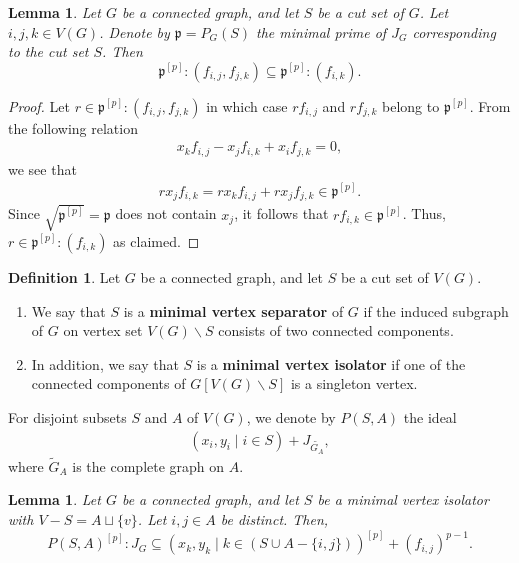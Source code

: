 \documentclass[12pt,a4paper]{amsart}
\theoremstyle{plain}
\newtheorem{lemma}[thrm]{Lemma}
\theoremstyle{definition}
\newtheorem{defn}[thrm]{Definition}
\def\bdefn{\begin{defn}}
\def\edefn{\end{defn}}
\theoremstyle{remark}
\let\setminus=\smallsetminus
\def\p{\mathfrak{p}}
\begin{document}
\begin{lemma}\label{lem:swap}
Let $G$ be a connected graph, and let $S$ be a cut set of $G$. Let $i,j,k \in V(G)$. Denote by $\p = P_G(S)$ the minimal prime of $J_{G}$ corresponding to the cut set $S$. Then $$\p^{[p]}:(f_{i,j},f_{j,k}) \subseteq \p^{[p]}:(f_{i,k}).$$
\end{lemma}

\begin{proof}
Let $r \in \p^{[p]}:(f_{i,j},f_{j,k})$ in which case $rf_{i,j}$ and $rf_{j,k}$ belong to $\p^{[p]}$. From the following  relation 
\begin{align*}
    x_kf_{i,j} - x_jf_{i,k} + x_if_{j,k} = 0,
\end{align*}
we see that
\begin{align*}
    rx_jf_{i,k} = rx_kf_{i,j} + rx_jf_{j,k} \in \p^{[p]}.
\end{align*}
Since $\sqrt{\p^{[p]}} = \p$ does not contain $x_j$, it follows that $rf_{i,k} \in \p^{[p]}$. Thus, $r \in \p^{[p]}:(f_{i,k})$ as claimed.
\end{proof}

\bdefn \label{defn_minimal_vertex_isolators}
Let $G$ be a connected graph, and let $S$  be a cut set of $V(G)$. 
\begin{enumerate}
    \item We say that $S$ is a \textbf{minimal vertex separator} of $G$ if the induced subgraph of $G$ on vertex set $V(G) \setminus S$ consists of two connected components.
    \item In addition, we say that $S$ is a \textbf{minimal vertex isolator} if one of the connected components of $G[V(G) \setminus S]$ is a singleton vertex.
\end{enumerate}
For disjoint subsets $S$ and $A$ of $V(G)$, we denote by $P(S,A)$ the ideal 
\begin{align*}
    (x_i,y_i \mid i \in S) + J_{\tilde{G_A}},
\end{align*}
where $\tilde{G}_A$ is the complete graph on $A$.
\edefn

\begin{lemma}\label{lem:one:colon}
Let $G$ be a connected graph, and let $S$ be a minimal vertex isolator with $V-S = A \sqcup \{v\}$.  Let $i,j \in A$ be distinct.  Then, \[P(S,A)^{[p]}:J_G \subseteq (x_k,y_k\mid k \in (S \cup A - \{i,j\}))^{[p]} + (f_{i,j})^{p-1}.\]
\end{lemma}
\end{document}
